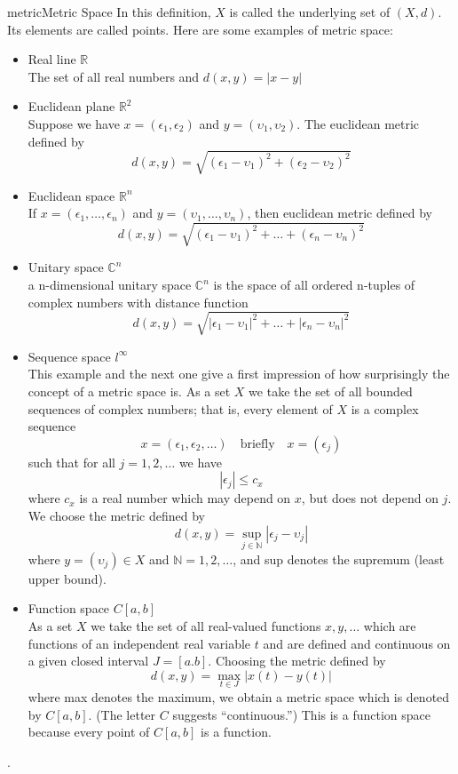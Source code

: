 \documentclass[9pt]{article}
\begin{document}
\begin{topic}{metric}{Metric Space}
In this definition, $X$ is called the underlying set of $(X,d)$. Its elements are called points. Here are some examples of metric space:
\begin{itemize}
\item Real line $\mathbb{R}$\\
The set of all real numbers and $d(x,y) = |x-y|$
\item Euclidean plane $\mathbb{R}^2$\\
Suppose we have $x = (\epsilon_1,\epsilon_2)$ and $y = (\upsilon_1,\upsilon_2)$. The euclidean metric defined by 
\[
d(x,y) = \sqrt{(\epsilon_1-\upsilon_1)^2+(\epsilon_2-\upsilon_2)^2}
\]
\item Euclidean space $\mathbb{R}^n$\\
If $x = (\epsilon_1,\ldots,\epsilon_n)$ and $y = (\upsilon_1,\ldots,\upsilon_n)$, then euclidean metric defined by 
\[
d(x,y) = \sqrt{(\epsilon_1-\upsilon_1)^2+\ldots+(\epsilon_n-\upsilon_n)^2}
\]
\item Unitary space $\mathbb{C}^n$\\
a n-dimensional unitary space $\mathbb{C}^n$ is the space of all ordered n-tuples of complex numbers with distance function
\[
d(x,y) = \sqrt{|\epsilon_1-\upsilon_1|^2+\ldots+|\epsilon_n-\upsilon_n|^2}
\]
\item Sequence space $l^{\infty}$\\
 This example and the next one give a first impression of how surprisingly the concept of a metric space is. As a set $X$ we take the set of all bounded sequences of complex numbers; that is, every element of $X$ is a complex sequence
 \[
 x = (\epsilon_1,\epsilon_2,\ldots) \quad \text{briefly} \quad  x = (\epsilon_j)
 \]
 such that for all $j=1,2,\ldots$ we have 
\[
|\epsilon_j|\le c_x
\]
where $c_x$ is a real number which may depend on $x$, but does not depend on $j$. We choose the metric defined by
\[
d(x,y) = \sup_{j \in \mathbb{N}}|\epsilon_j-\upsilon_j|
\]
where $y = (\upsilon_j) \in X$ and $\mathbb{N} = {1,2,\ldots}$, and sup denotes the supremum (least upper bound).
 \item Function space $C[a,b]$\\
 As a set $X$ we take the set of all real-valued functions $x,y,\ldots$ which are functions of an independent real variable $t$ and are defined and continuous on a given closed interval $J = [a.b]$. Choosing the metric defined by 
 \[
 d(x,y) = \max_{t\in J}|x(t)-y(t)|
 \]
 where max denotes the maximum, we obtain a metric space which is denoted by $C[a,b]$. (The letter $C$ suggests ``continuous.'') This is a function space because every point of $C[a,b]$ is a function.
\end{itemize}
\citep{Kreyszig1989Introductory}.
\end{topic}
\end{document}
